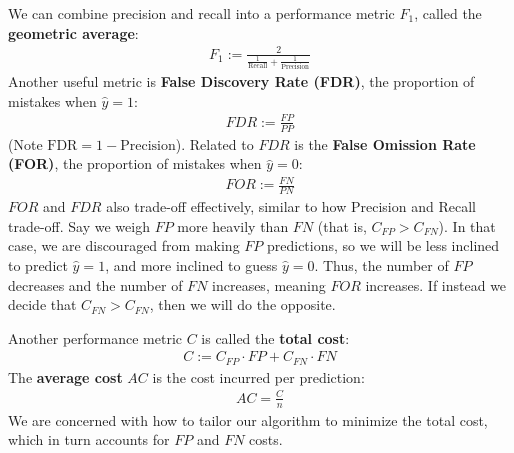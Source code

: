 \documentclass[12pt, a4paper]{article}
\theoremstyle{definition}
\begin{document}
	We can combine precision and recall into a performance metric $F_1$,
	called the \textbf{geometric average}:
	\begin{align*}
		F_1 := \frac{2}{\frac{1}{\text{Recall}} + \frac{1}{\text{Precision}}}
	\end{align*}
	Another useful metric is \textbf{False Discovery Rate (FDR)}, the proportion
	of mistakes when $\hat{y}=1$:
	\begin{align*}
		FDR := \frac{FP}{PP}
	\end{align*}
	(Note $\text{FDR} = 1 - \text{Precision}$).
	Related to $FDR$ is the \textbf{False Omission Rate (FOR)}, the proportion
	of mistakes when $\hat{y}=0$:
	\begin{align*}
		FOR := \frac{FN}{PN}
	\end{align*}
	$FOR$ and $FDR$ also trade-off effectively, similar to how Precision and Recall
	trade-off.	 Say we weigh $FP$ more heavily than $FN$ (that is, $C_{FP} > C_{FN}$).
	In that case, we are discouraged from making $FP$ predictions, so we will be less inclined
	to predict $\hat{y}=1$, and more inclined to guess $\hat{y}=0$. Thus, the number of
	$FP$ decreases and the number of $FN$ increases, meaning $FOR$ increases. If instead we
	decide that $C_{FN} > C_{FN}$, then we will do the opposite.
	
	Another performance metric $C$ is called the \textbf{total cost}:
	\begin{align*}
		C := C_{FP} \cdot FP + C_{FN} \cdot FN
	\end{align*}
	The \textbf{average cost} $AC$ is the cost incurred per prediction:
	\begin{align*}
		AC = \frac{C}{n}
	\end{align*}
	We are concerned with how to tailor our algorithm to minimize the total cost,
	which in turn accounts for $FP$ and $FN$ costs.
	
\end{document}
